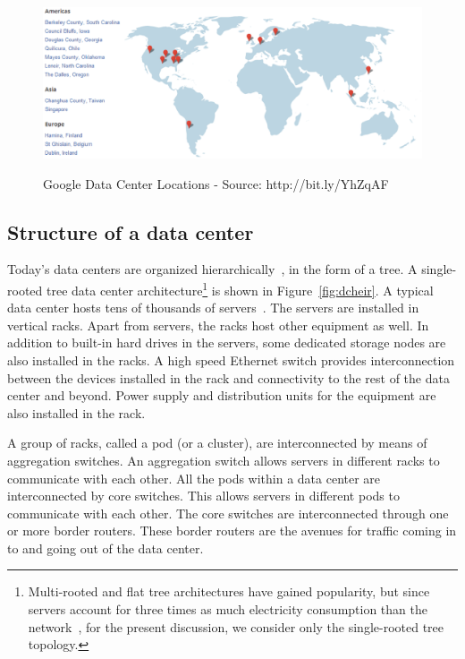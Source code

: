 \begin{figure}
\includegraphics[width=1\textwidth]{pics/googledcmap2.eps}
\label{fig:googledcmap}
\caption{Google Data Center Locations - Source: http://bit.ly/YhZqAF}
\end{figure}

\subsection{Structure of a data center} Today's data centers are organized hierarchically~\cite{dcnetworking:vahdat:micro:2010}, in the form of a tree. A single-rooted tree data center architecture\footnote{Multi-rooted and flat tree architectures have gained popularity, but since servers account for three times as much electricity consumption than the network~\cite{costCloud}, for the present discussion, we consider only the single-rooted tree topology.} is shown in Figure~\ref{fig:dcheir}. A typical data center hosts tens of thousands of servers~\cite{Abts:2012:GTD:2184319.2184335}. The servers are installed in vertical racks. Apart from servers, the racks host other equipment as well. In addition to built-in hard drives in the servers, some dedicated storage nodes are also installed in the racks. A high speed Ethernet switch provides interconnection between the devices installed in the rack and connectivity to the rest of the data center and beyond. Power supply and distribution units for the equipment are also installed in the rack. 

A group of racks, called a pod (or a cluster), are interconnected by means of aggregation switches. An aggregation switch allows servers in different racks to communicate with each other. All the pods within a data center are interconnected by core switches. This allows servers in different pods to communicate with each other. The core switches are interconnected through one or more border routers. These border routers are the avenues for traffic coming in to and going out of the data center. 

